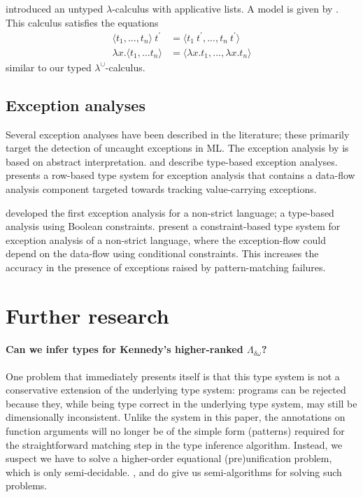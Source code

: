 \documentclass{llncs}
\newcommand{\LambdaUnion}{\lambda^\cup}
\begin{document}
\cite{Revesz:1992:LEL:131057.131060} introduced an untyped $\lambda$-calculus with applicative lists. A model is given by \cite{Durfee97amodel}. This calculus satisfies the equations
    \begin{align}
        \langle t_1, ..., t_n \rangle\ t^\prime &= \langle t_1\ t^\prime, ..., t_n\ t^\prime \rangle \tag{$\gamma_1$} \\
        \lambda x. \langle t_1, ... t_n \rangle &= \langle \lambda x. t_1, ..., \lambda x. t_n \rangle \tag{$\gamma_2$}
    \end{align}
similar to our typed $\LambdaUnion$-calculus.

\subsection{Exception analyses}

Several exception analyses have been described in the literature; these primarily target the detection of uncaught exceptions in ML.
The exception analysis by \cite{kyi} is based on abstract interpretation.
\cite{Guzman94anextended} and \cite{Fahndrich:1998:TDE:893957} describe type-based exception analyses. \cite{Leroy:2000:TAU:349214.349230} presents a row-based type system for exception analysis that contains a data-flow analysis component targeted towards tracking value-carrying exceptions.

\cite{Glynn:2002:EAN:581478.581488} developed the first exception analysis for a non-strict language; a type-based analysis using Boolean constraints. \cite{Koot:2015:TEA:2678015.2682542} present a constraint-based type system for exception analysis of a non-strict language, where the exception-flow could depend on the data-flow using conditional constraints. This increases the accuracy in the presence of exceptions raised by pattern-matching failures.
\section{Further research}\label{section-future-research}


\paragraph{Can we infer types for Kennedy's higher-ranked $\Lambda_{\delta\omega}$?} One problem that immediately presents itself is that this type system is not a conservative extension of the underlying type system: programs can be rejected because they, while being type correct in the underlying type system, may still be dimensionally inconsistent.
Unlike the system in this paper, the annotations on function arguments will no longer be of the simple form (patterns) required for the straightforward matching step in the type inference algorithm. Instead, we suspect we have to solve a higher-order equational (pre)unification problem, which is only semi-decidable.
\cite{Snyder:1990:HOE:648229.752474}, \cite{NipkowQian1991} and \cite{QIAN1996401} do give us semi-algorithms for solving such problems.
    
\end{document}
